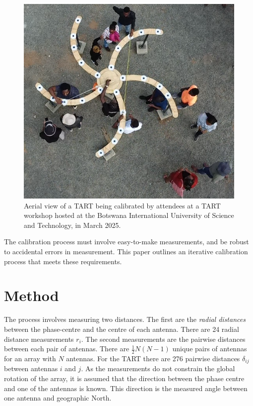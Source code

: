 \documentclass[a4paper,10pt]{article}
\begin{document}
\begin{figure}
 \includegraphics[width=\linewidth]{fig/botswana_calibration.png}
 \caption{Aerial view of a TART being calibrated by attendees at a TART workshop hosted at the Botswana International University of Science and Technology, in March 2025.}
\end{figure}

The calibration process must involve easy-to-make measurements, and be robust to accidental errors in measurement. This paper outlines an iterative calibration process that meets these requirements.

\section{Method}

The process involves measuring two distances. The first are the {\em radial distances} between the phase-centre and the centre of each antenna. There are 24 radial distance measurements $r_i$. The second measurements are the pairwise distances between each pair of antennas. There are $\frac{1}{2} N (N-1)$ unique pairs of antennas for an array with $N$ antennas. For the TART there are 276 pairwise distances $\delta_{ij}$ between antennas $i$ and $j$. As the measurements do not constrain the global rotation of the array, it is assumed that the direction between the phase centre and one of the antennas is known. This direction is the measured angle between one antenna and geographic North.
\end{document}
